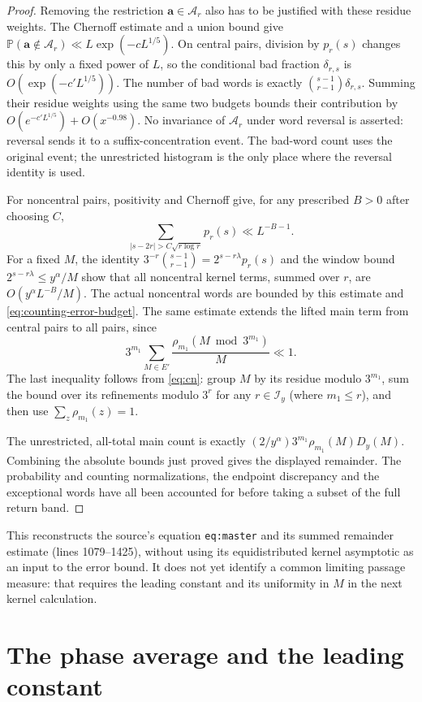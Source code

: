 \documentclass[11pt]{article}
\theoremstyle{remark}\newtheorem{remark}[proposition]{Remark}
\newcommand{\PP}{\mathbb P}
\begin{document}
\begin{proof}
Removing the restriction $\mathbf a\in\mathcal A_r$ also has to be
justified with these residue weights. The Chernoff estimate and a union
bound give $\PP(\mathbf a\notin\mathcal A_r)\ll
L\exp(-cL^{1/5})$. On central pairs, division by $p_r(s)$ changes this
by only a fixed power of $L$, so the conditional bad fraction
$\delta_{r,s}$ is $O(\exp(-c'L^{1/5}))$.
The number of bad words is exactly
$\binom{s-1}{r-1}\delta_{r,s}$. Summing their residue weights using the
same two budgets bounds their contribution by
$O(e^{-c'L^{1/5}})+O(x^{-0.98})$.
No invariance of $\mathcal A_r$ under word reversal is asserted:
reversal sends it to a suffix-concentration event. The bad-word count
uses the original event; the unrestricted histogram is the only place
where the reversal identity is used.

For noncentral pairs, positivity and Chernoff give, for any prescribed
$B>0$ after choosing $C$,
\[
 \sum_{|s-2r|>C\sqrt{r\log r}}p_r(s)\ll L^{-B-1}.
\]
For a fixed $M$, the identity
$3^{-r}\binom{s-1}{r-1}=2^{s-r\lambda}p_r(s)$ and the window bound
$2^{s-r\lambda}\le y^\alpha/M$ show that all noncentral kernel terms,
summed over $r$, are $O(y^\alpha L^{-B}/M)$.
The actual noncentral words are bounded by this estimate and
\eqref{eq:counting-error-budget}. The same estimate extends the lifted
main term from central pairs to all pairs, since
\[
 3^{m_1}\sum_{M\in E'}\frac{\rho_{m_1}(M\bmod3^{m_1})}{M}\ll1.
\]
The last inequality follows from \eqref{eq:cn}: group $M$ by its
residue modulo $3^{m_1}$, sum the bound over its refinements modulo
$3^r$ for any $r\in\mathcal I_y$ (where $m_1\le r$), and then use
$\sum_z\rho_{m_1}(z)=1$.

The unrestricted, all-total main count is exactly
$(2/y^\alpha)3^{m_1}\rho_{m_1}(M)D_y(M)$. Combining the absolute bounds
just proved gives the displayed remainder. The probability and counting
normalizations, the endpoint discrepancy and the exceptional words have
all been accounted for before taking a subset of the full return band.
\end{proof}

This reconstructs the source's equation \texttt{eq:master} and its
summed remainder estimate (lines 1079--1425), without using its
equidistributed kernel asymptotic as an input to the error bound.
It does not yet identify a common limiting passage measure: that requires
the leading constant and its uniformity in $M$ in the next kernel
calculation.

\section{The phase average and the leading constant}
\end{document}
